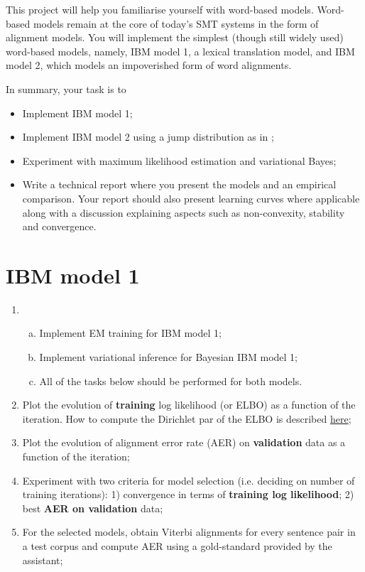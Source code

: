 
This project will help you familiarise yourself with word-based
models.  Word-based models remain at the core of today's SMT systems
in the form of alignment models.
You will implement the simplest (though still widely used) word-based
models, namely, IBM model 1, a lexical translation model, and IBM model 2, which models an impoverished form of word alignments.

In summary, your task is to

\begin{itemize}
	\item Implement IBM model 1;
	\item Implement IBM model 2 using a jump distribution as in \cite{Vogel+1996:HMMWA};
	\item Experiment with maximum likelihood estimation and variational Bayes;
	\item Write a technical report where you present the models and an empirical comparison. Your report should also present learning curves
    where applicable along with a discussion explaining aspects such
    as non-convexity, stability and convergence.
\end{itemize}

\section{IBM model 1}

\begin{enumerate}
	\item 
	\begin{enumerate}[a)]
		\item Implement EM training \citep{Brown+1993:smt} for IBM model 1;
		\item Implement variational inference for Bayesian IBM model 1;
		\item All of the tasks below should be performed for both models.
	\end{enumerate}
	\item Plot the evolution of {\bf training} log likelihood (or ELBO) as a function of the iteration. How to compute the Dirichlet par of the ELBO
	is described \href{https://github.com/philschulz/PublicWriting/blob/master/DirichletElbo/DirichletELBO.pdf}{here};
	\item Plot the evolution of alignment error rate (AER) on {\bf validation} data as a function of the iteration;
	\item Experiment with two criteria for model selection (i.e. deciding on number of training iterations): 1) convergence in terms of {\bf training log likelihood}; 2) best {\bf AER on validation} data;
	\item For the selected models, obtain Viterbi alignments for every sentence pair in a test corpus and compute AER using a gold-standard provided by the assistant;
\end{enumerate}

